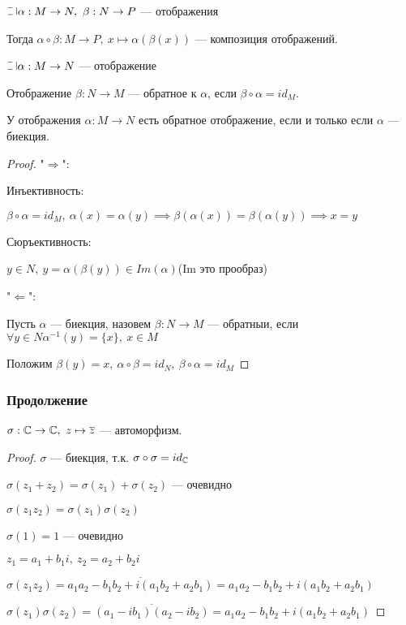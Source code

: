 \begin{defn}
    $\letus \alpha: M \to N,~\beta: N \to P$ --- отображения
    
    Тогда $\alpha \circ \beta: M \to P,~x \mapsto \alpha(\beta(x))$ --- композиция отображений.
\end{defn}

\begin{defn}
    $\letus \alpha: M \to N$ --- отображение

    Отображение $\beta: N \to M$ --- обратное к $\alpha$, если $\beta \circ \alpha = id_M$.
\end{defn}

\begin{theorem-non}
    У отображения $\alpha: M \to N$ есть обратное отображение, если и только если $\alpha$ --- биекция.
\end{theorem-non}


\begin{proof}
    
    "$\Rightarrow$":
    
    Инъективность:
    
    $\beta \circ \alpha = id_M,~\alpha(x) = \alpha(y) \implies \beta(\alpha(x)) = \beta(\alpha(y)) \implies x = y$
    
    Сюръективность:
    
    $y \in N,~y = \alpha(\beta(y)) \in Im(\alpha)$(Im это прообраз)
    
    "$\Leftarrow$":
    
    Пусть $\alpha$ --- биекция, назовем $\beta: N \to M$ --- обратныи, если $\forall y \in N \alpha^{-1}(y) = \{x\},~x \in M$
    
    Положим $\beta(y) = x,~\alpha \circ \beta = id_N,~\beta \circ \alpha = id_M$
\end{proof}

\subsubsection*{Продолжение}

\begin{theorem-non}
    $\sigma: \mathbb{C} \to \mathbb{C},~z \mapsto \overline{z}$ --- автоморфизм.
\end{theorem-non}

\begin{proof}
    
    $\sigma$ --- биекция, т.к. $\sigma \circ \sigma = id_{\mathbb{C}}$
    
    $\sigma(z_1 + z_2) = \sigma(z_1) + \sigma(z_2)$ --- очевидно
    
    $\sigma(z_1 z_2) = \sigma(z_1) \sigma(z_2)$
    
    $\sigma(1) = 1$ --- очевидно
    
    $z_1 = a_1 + b_1i,~z_2 = a_2 + b_2i$
    
    $\sigma(z_1 z_2) = \overline{a_1 a_2 - b_1 b_2 + i(a_1 b_2 + a_2 b_1)} = a_1 a_2 - b_1 b_2 + i(a_1 b_2 + a_2 b_1)$
    
    $\sigma(z_1) \sigma(z_2) = \overline{(a_1 - i b_1) (a_2 - i b_2)} = a_1 a_2 - b_1 b_2 + i(a_1 b_2 + a_2 b_1)$
\end{proof}